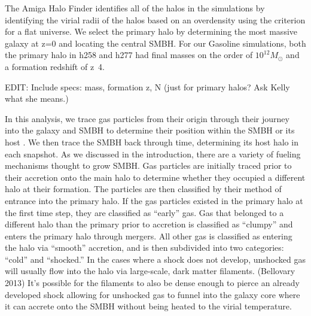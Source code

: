 \documentclass[manuscript]{aastex}
\begin{document}
	
The Amiga Halo Finder identifies all of the halos in the simulations by identifying the virial radii of the halos based on an overdensity using the criterion for a flat universe. \citep{Knebe2001,Knollmann2009,Gill2004} We select the primary halo by determining the most massive galaxy at z=0 and locating the central SMBH. For our Gasoline simulations, both the primary halo in h258 and h277 had final masses on the order of $10^{12} M_{\odot}$ and a formation redshift of z~4.  

EDIT: Include specs: mass, formation z, N (just for primary halos? Ask Kelly what she means.)

In this analysis, we trace gas particles from their origin through their journey into the galaxy and SMBH to determine their position within the SMBH or its host \citep{Brooks2009} . We then trace the SMBH back through time, determining its host halo in each snapshot. As we discussed in the introduction, there are a variety of fueling mechanisms thought to grow SMBH. Gas particles are initially traced prior to their accretion onto the main halo to determine whether they occupied a different halo at their formation. The particles are then classified by their method of entrance into the primary halo. If the gas particles existed in the primary halo at the first time step, they are classified as ``early'' gas. Gas that belonged to a different halo than the primary prior to accretion is classified as ``clumpy'' and enters the primary halo through mergers. All other gas is classified as entering the halo via ``smooth'' accretion, and is then subdivided into two categories: ``cold'' and ``shocked.'' In the cases where a shock does not develop, unshocked gas will usually flow into the halo via large-scale, dark matter filaments. (Bellovary 2013) It's possible for the filaments to also be dense enough to pierce an already developed shock allowing for unshocked gas to funnel into the galaxy core where it can accrete onto the SMBH without being heated to the virial temperature.
	
\end{document}
